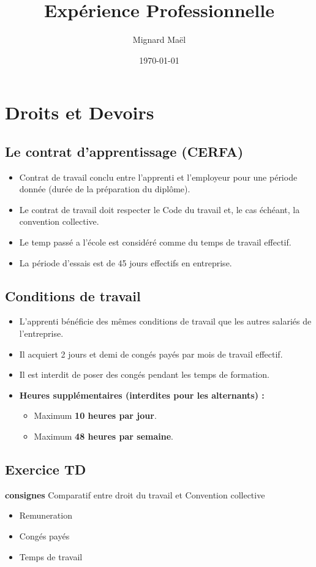\documentclass[a4paper,12pt]{article}
\title{Expérience Professionnelle}
\author{Mignard Maël}
\date{\today}
\begin{document}
\maketitle
\section{Droits et Devoirs}

\vspace{1cm}
\subsection*{Le contrat d'apprentissage (CERFA)}
\begin{itemize}
    \item Contrat de travail conclu entre l'apprenti et l'employeur pour une période donnée (durée de la préparation du diplôme).
    \item Le contrat de travail doit respecter le Code du travail et, le cas échéant, la convention collective.
    \item Le temp passé a l'école est considéré comme du temps de travail effectif.
    \item La période d'essais est de 45 jours effectifs en entreprise.
\end{itemize}
\subsection*{Conditions de travail}
\begin{itemize}
    \item L'apprenti bénéficie des mêmes conditions de travail que les autres salariés de l'entreprise.
    \item Il acquiert 2 jours et demi de congés payés par mois de travail effectif.
    \item Il est interdit de poser des congés pendant les temps de formation.
    \item \textbf{Heures supplémentaires (interdites pour les alternants) :}
    \begin{itemize}
        \setlength\itemsep{0.3em}
        \item Maximum \textbf{10 heures par jour}.
        \item Maximum \textbf{48 heures par semaine}.
    \end{itemize}
\end{itemize}
\clearpage
\subsection{Exercice TD}
\vspace{1cm}
\textbf{consignes}
Comparatif entre droit du travail et Convention collective
\begin{itemize}
    \item Remuneration
    \item Congés payés
    \item Temps de travail
\end{itemize}
\vspace{1cm}
\end{document}
